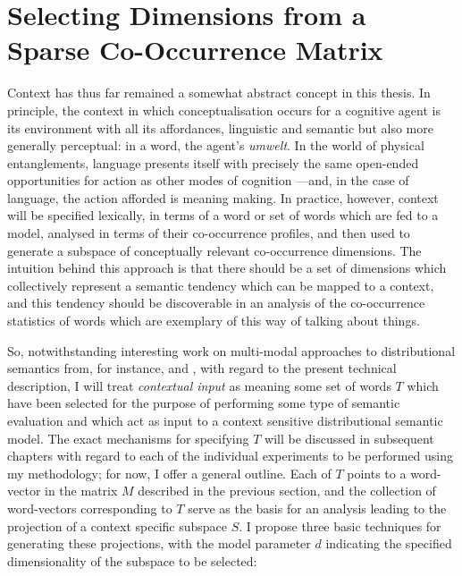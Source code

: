 \section{Selecting Dimensions from a Sparse Co-Occurrence Matrix} \label{sec:project}
Context has thus far remained a somewhat abstract concept in this thesis.  In principle, the context in which conceptualisation occurs for a cognitive agent is its environment with all its affordances, linguistic and semantic but also more generally perceptual: in a word, the agent's \emph{umwelt}.  In the world of physical entanglements, language presents itself with precisely the same open-ended opportunities for action as other modes of cognition \citep{Gibson1979,Clark1997}---and, in the case of language, the action afforded is meaning making.  In practice, however, context will be specified lexically, in terms of a word or set of words which are fed to a model, analysed in terms of their co-occurrence profiles, and then used to generate a subspace of conceptually relevant co-occurrence dimensions.  The intuition behind this approach is that there should be a set of dimensions which collectively represent a semantic tendency which can be mapped to a context, and this tendency should be discoverable in an analysis of the co-occurrence statistics of words which are exemplary of this way of talking about things.


So, notwithstanding interesting work on multi-modal approaches to distributional semantics from, for instance, \cite{HillEA2014} and \cite{BruniEA2014}, with regard to the present technical description, I will treat \emph{contextual input} as meaning some set of words $T$ which have been selected for the purpose of performing some type of semantic evaluation and which act as input to a context sensitive distributional semantic model.  The exact mechanisms for specifying $T$ will be discussed in subsequent chapters with regard to each of the individual experiments to be performed using my methodology; for now, I offer a general outline.  Each   of $T$ points to a word-vector in the matrix $M$ described in the previous section, and the collection of word-vectors corresponding to $T$ serve as the basis for an analysis leading to the projection of a context specific subspace $S$.  I propose three basic techniques for generating these projections, with the model parameter $d$ indicating the specified dimensionality of the subspace to be selected:

